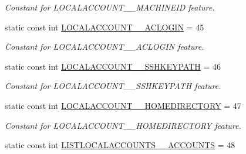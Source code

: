 \begin{DoxyCompactItemize}
\begin{DoxyCompactList}\small\item\em Constant for LOCALACCOUNT\_\-\_\-MACHINEID feature. \item\end{DoxyCompactList}\item 
\hypertarget{classUMS__Data_1_1UMS__DataPackage_a9a3ffade482de9adba5230d1a0c78b0b}{
static const int \hyperlink{classUMS__Data_1_1UMS__DataPackage_a9a3ffade482de9adba5230d1a0c78b0b}{LOCALACCOUNT\_\-\_\-ACLOGIN} = 45}
\label{classUMS__Data_1_1UMS__DataPackage_a9a3ffade482de9adba5230d1a0c78b0b}

\begin{DoxyCompactList}\small\item\em Constant for LOCALACCOUNT\_\-\_\-ACLOGIN feature. \item\end{DoxyCompactList}\item 
\hypertarget{classUMS__Data_1_1UMS__DataPackage_a28056d0cb614560b49870784199c2f2b}{
static const int \hyperlink{classUMS__Data_1_1UMS__DataPackage_a28056d0cb614560b49870784199c2f2b}{LOCALACCOUNT\_\-\_\-SSHKEYPATH} = 46}
\label{classUMS__Data_1_1UMS__DataPackage_a28056d0cb614560b49870784199c2f2b}

\begin{DoxyCompactList}\small\item\em Constant for LOCALACCOUNT\_\-\_\-SSHKEYPATH feature. \item\end{DoxyCompactList}\item 
\hypertarget{classUMS__Data_1_1UMS__DataPackage_a58a65af3d275e9d2e8be808088eead98}{
static const int \hyperlink{classUMS__Data_1_1UMS__DataPackage_a58a65af3d275e9d2e8be808088eead98}{LOCALACCOUNT\_\-\_\-HOMEDIRECTORY} = 47}
\label{classUMS__Data_1_1UMS__DataPackage_a58a65af3d275e9d2e8be808088eead98}

\begin{DoxyCompactList}\small\item\em Constant for LOCALACCOUNT\_\-\_\-HOMEDIRECTORY feature. \item\end{DoxyCompactList}\item 
\hypertarget{classUMS__Data_1_1UMS__DataPackage_ac40a6344421ebafcf61f1131a3f3fe10}{
static const int \hyperlink{classUMS__Data_1_1UMS__DataPackage_ac40a6344421ebafcf61f1131a3f3fe10}{LISTLOCALACCOUNTS\_\-\_\-ACCOUNTS} = 48}
\label{classUMS__Data_1_1UMS__DataPackage_ac40a6344421ebafcf61f1131a3f3fe10}


\end{DoxyCompactItemize}
